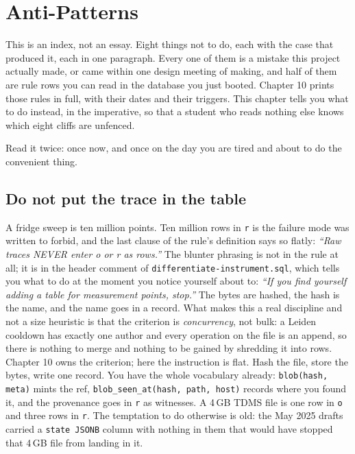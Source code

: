 \chapter{Anti-Patterns}

This is an index, not an essay. Eight things not to do, each with the case that produced it, each in one paragraph. Every one of them is a mistake this project actually made, or came within one design meeting of making, and half of them are rule rows you can read in the database you just booted. Chapter 10 prints those rules in full, with their dates and their triggers. This chapter tells you what to do instead, in the imperative, so that a student who reads nothing else knows which eight cliffs are unfenced.

Read it twice: once now, and once on the day you are tired and about to do the convenient thing.

\section{Do not put the trace in the table}

A fridge sweep is ten million points. Ten million rows in \texttt{r} is the failure mode  was written to forbid, and the last clause of the rule's definition says so flatly: \textit{``Raw traces NEVER enter o or r as rows.''} The blunter phrasing is not in the rule at all; it is in the header comment of \texttt{differentiate-instrument.sql}, which tells you what to do at the moment you notice yourself about to: \textit{``If you find yourself adding a table for measurement points, stop.''} The bytes are hashed, the hash is the name, and the name goes in a record. What makes this a real discipline and not a size heuristic is that the criterion is \emph{concurrency}, not bulk: a Leiden cooldown has exactly one author and every operation on the file is an append, so there is nothing to merge and nothing to be gained by shredding it into rows. Chapter 10 owns the criterion; here the instruction is flat. Hash the file, store the bytes, write one record. You have the whole vocabulary already: \texttt{blob(hash, meta)} mints the ref, \texttt{blob\_seen\_at(hash, path, host)} records where you found it, and the provenance goes in \texttt{r} as witnesses. A 4\,GB TDMS file is one row in \texttt{o} and three rows in \texttt{r}. The temptation to do otherwise is old: the May 2025 drafts carried a \texttt{state JSONB} column with nothing in them that would have stopped that 4\,GB file from landing in it.

